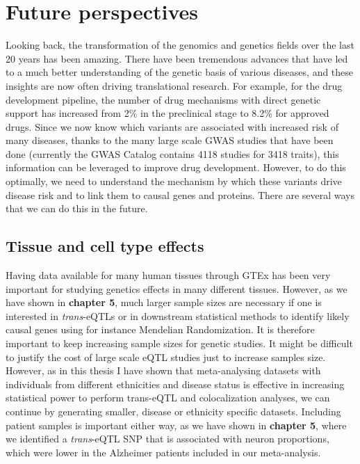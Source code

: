 \section{Future perspectives}

Looking back, the transformation of the genomics and genetics fields over the last 20 years has been amazing. There have been tremendous advances that have led to a much better understanding of the genetic basis of various diseases, and these insights are now often driving translational research. For example, for the drug development pipeline, the number of drug mechanisms with direct genetic support has increased from 2\% in the preclinical stage to 8.2\% for approved drugs\cite{nelsonSupportHumanGenetic2015}. Since we now know which variants are associated with increased risk of many diseases, thanks to the many large scale GWAS studies that have been done (currently the GWAS Catalog\cite{macarthurNewNHGRIEBICatalog2017} contains 4118 studies for 3418 traits), this information can be leveraged to improve drug development. However, to do this optimally, we need to understand the mechanism by which these variants drive disease risk and to link them to causal genes and proteins. There are several ways that we can do this in the future.

\subsection{Tissue and cell type effects}
Having data available for many human tissues through GTEx\cite{thegtexconsortiumGTExConsortiumAtlas2020} has been very important for studying genetics effects in many different tissues. However, as we have shown in \textbf{chapter 5}, much larger sample sizes are necessary if one is interested in \textit{trans}-eQTLs or in downstream statistical methods to identify likely causal genes using for instance Mendelian Randomization. It is therefore important to keep increasing sample sizes for genetic studies. It might be difficult to justify the cost of large scale eQTL studies just to increase samples size. However, as in this thesis I have shown that meta-analysing datasets with individuals from different ethnicities and disease status is effective in increasing statistical power to perform trans-eQTL and colocalization analyses, we can continue by generating smaller, disease or ethnicity specific datasets. Including patient samples is important either way, as we have shown in \textbf{chapter 5}, where we identified a \textit{trans}-eQTL SNP that is associated with neuron proportions, which were lower in the Alzheimer patients included in our meta-analysis. 


